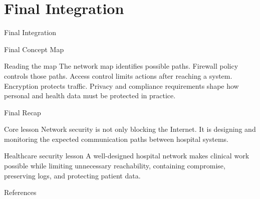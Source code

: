 \documentclass[presentation]{beamer}
\newcommand{\sectiontitleframe}[1]{
\begin{frame}[plain,c]
\begin{center}
{\usebeamerfont{title}\usebeamercolor[fg]{title}#1}
\end{center}
\end{frame}
}
\begin{document}
\section{Final Integration}
\sectiontitleframe{Final Integration}

\begin{frame}[c]{Final Concept Map}
\begin{center}
\end{center}

\begin{block}{Reading the map}
The network map identifies possible paths. Firewall policy controls those paths. Access control
limits actions after reaching a system. Encryption protects traffic. Privacy and compliance
requirements shape how personal and health data must be protected in practice.
\end{block}
\end{frame}

\begin{frame}[c]{Final Recap}
\begin{block}{Core lesson}
Network security is not only blocking the Internet. It is designing and monitoring the expected
communication paths between hospital systems.
\end{block}

\begin{block}{Healthcare security lesson}
A well-designed hospital network makes clinical work possible while limiting unnecessary reachability,
containing compromise, preserving logs, and protecting patient data.
\end{block}
\end{frame}

\begin{frame}[allowframebreaks]{References}
\scriptsize


\end{frame}
\end{document}
